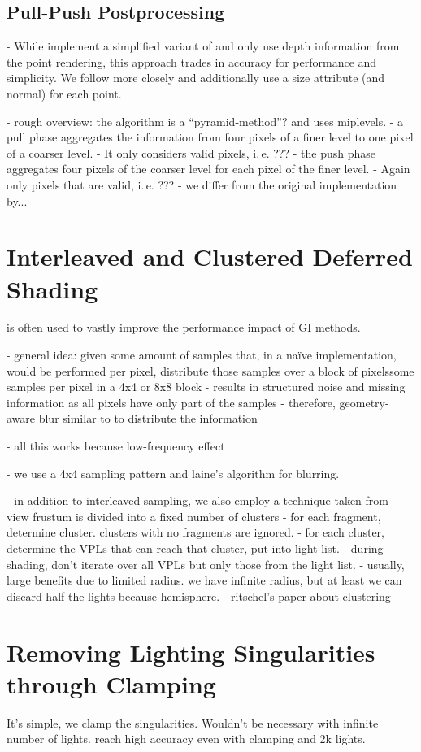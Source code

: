 \subsection{Pull-Push Postprocessing}

- While \citep{ritschel2008ism} implement a simplified variant of \citet{Marroquim:2007:reconstruction} and only use depth information from the point rendering, this approach trades in accuracy for performance and simplicity. We follow \citet{Marroquim:2007:reconstruction} more closely and additionally use a size attribute (and normal) for each point.

- rough overview: the algorithm is a ``pyramid-method''? and uses miplevels.
- a pull phase aggregates the information from four pixels of a finer level to one pixel of a coarser level.
- It only considers valid pixels, i.\,e. ???
- the push phase aggregates four pixels of the coarser level for each pixel of the finer level.
- Again only pixels that are valid, i.\,e. ???
- we differ from the original implementation by...



\section{Interleaved and Clustered Deferred Shading}
\label{sec:interleavedAndClusteredShading}
\citep{Keller:2001:InterleavedSampling} is often used to vastly improve the performance impact of GI methods.

- general idea: given some amount of samples that, in a naïve implementation, would be performed per pixel, distribute those samples over a block of pixelssome samples per pixel in a 4x4 or 8x8 block
- results in structured noise and missing information as all pixels have only part of the samples
- therefore, geometry-aware blur similar to \citet{laine2007incremental} to distribute the information

- all this works because low-frequency effect

- we use a 4x4 sampling pattern and laine's algorithm for blurring.


- in addition to interleaved sampling, we also employ a technique taken from \citet{olsson2012clustered}
- view frustum is divided into a fixed number of clusters
- for each fragment, determine cluster. clusters with no fragments are ignored.
- for each cluster, determine the VPLs that can reach that cluster, put into light list.
- during shading, don't iterate over all VPLs but only those from the light list.
- usually, large benefits due to limited radius. we have infinite radius, but at least we can discard half the lights because hemisphere.
- ritschel's paper about clustering

\section{Removing Lighting Singularities through Clamping}
\label{sec:clamping}
It's simple, we clamp the singularities. Wouldn't be necessary with infinite number of lights. \citet{hedman2016sequential} reach high accuracy even with clamping and 2k lights.
